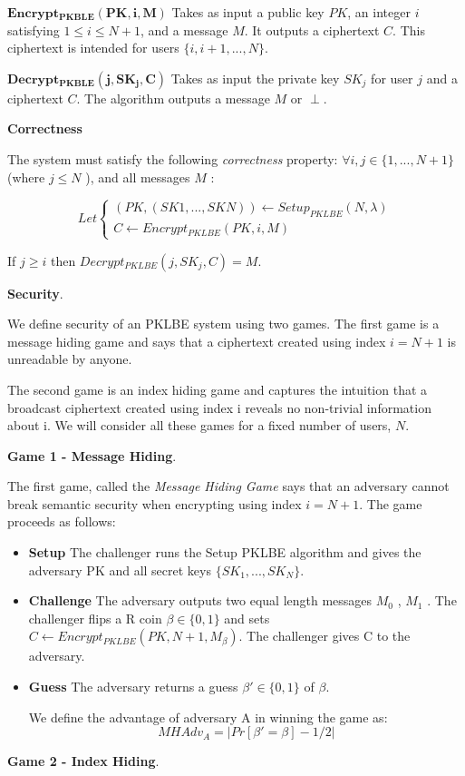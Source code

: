 \documentclass[a4paper, 12pt, oneside]{article}
\begin{document}
\bigskip
\textit{$\mathbf{Encrypt_{PKBLE}(PK, i, M )}$} 
Takes as input a public key $PK$, an integer $i$ satisfying $1 \leq i \leq N +1$, and a message $M$. It outputs a ciphertext $C$. This ciphertext is intended for users $\{i, i+1, . . . , N\}$.

\bigskip
\textit{$\mathbf{Decrypt_{PKBLE}(j, SK_j , C)}$} 
 Takes as input the private key $SK_j$ for user $j$ and a ciphertext $C$. The algorithm outputs a message $M$ or $\perp$.

\bigskip
\textbf{Correctness}

The system must satisfy the following \textit{correctness} property: 
$\forall i, j \in \{1, . . . , N + 1\} $(where $j \leq N$ ), and all messages $M$ :


\[Let 
\begin{cases}
(PK, (SK 1 , . . . , SK N )) \leftarrow Setup_{PKLBE}(N, \lambda)\\
C \leftarrow Encrypt_{PKLBE} (PK, i, M )
\end{cases}
\]


If $j \geq i$ then $Decrypt_{PKLBE}(j, SK_j , C) = M$.

\bigskip

\textbf{Security}.


 We define security of an PKLBE system using two games. The first game is a message
hiding game and says that a ciphertext created using index $i = N + 1$ is unreadable by anyone.

The second game is an index hiding game and captures the intuition that a broadcast ciphertext created using index i reveals no non-trivial information about i. We will consider all these games for a fixed number of users, $N$.

\bigskip
\textbf{Game 1 - Message Hiding}.
 
The first game, called the \textit{Message Hiding Game} says that an adversary cannot break semantic security when encrypting using index $i = N + 1$. The game proceeds as follows:
\begin{itemize}

\item \textbf{Setup} The challenger runs the Setup PKLBE algorithm and gives the adversary PK and all
secret keys $\{SK_1 , . . . , SK_N \}$.

\item \textbf{Challenge} The adversary outputs two equal length messages $M_0$ , $M_1$ . The challenger flips a
R
coin $\beta \in \{0, 1\}$ and sets $C \leftarrow Encrypt_{PKLBE}(PK, N + 1, M_{\beta})$. The challenger gives C to the adversary.
\item \textbf{Guess} The adversary returns a guess $\beta' \in \{0, 1\}$ of $\beta$.


We define the advantage of adversary A in winning the game as:
\[MH Adv_A =\vert Pr[\beta'  = \beta] - 1/2\vert\]

\end{itemize}
\textbf{Game 2 - Index Hiding}.
\end{document}
